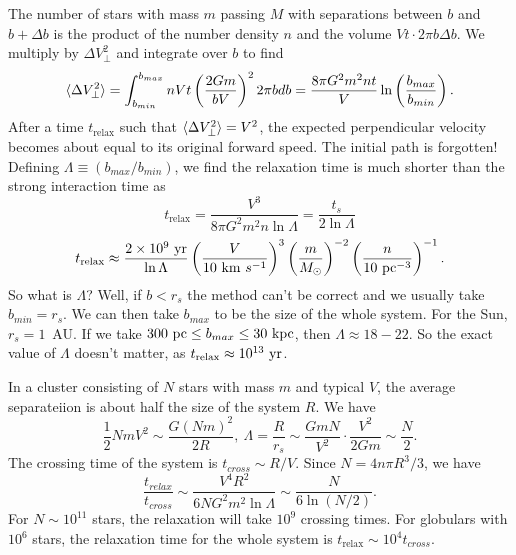 \documentclass[]{article}
\begin{document}
The number of stars with mass $m$ passing $M$ with
separations between $b$ and $b+\Delta b$ is the product of
the number density $n$ and the volume $V t \cdot 2 \pi b\Delta b$.
We multiply by $\Delta V_{\perp}^{2}$ and integrate over $b$ to find
\begin{equation}
\langle\Delta V_{\perp}^{2}\rangle = \int_{b_{min}}^{b_{max}} n V t\left(\frac{2Gm}{bV}\right)^2 2 \pi b db = \frac{8 \pi G^2 m^2 nt}{V} \ln \left(\frac{b_{max}}{b_{min}}\right).
\end{equation}
\noindent
After a time $t_{\mathrm{relax}}$ such that $\langle\Delta V_{\perp}^2\rangle = V^2$, the expected perpendicular 
velocity becomes about equal to its original forward speed.  The initial path is forgotten!
Defining $\Lambda\equiv (b_{max}/b_{min})$, we find the relaxation time is much shorter than
the strong interaction time as
\begin{equation}
t_{\mathrm{relax}} = \frac{V^3}{8\pi G^2 m^2 n \ln \Lambda} = \frac{t_s}{2 \ln \Lambda}
\end{equation}
\begin{equation}
t_{\mathrm{relax}} \approx \frac{2\times10^9~\mathrm{yr}}{\ln \Lambda}\left(\frac{V}{10~\mathrm{km}~s^{-1}}\right)^3\left(\frac{m}{M_{\odot}}\right)^{-2}\left(\frac{n}{10~\mathrm{pc}^{-3}}\right)^{-1}.
\end{equation}
\noindent
So what is $\Lambda$?  Well, if $b<r_s$ the method can't be correct and we usually take $b_{min} = r_s$.  We
can then take $b_{max}$ to be the size of the whole system.  For the Sun, $r_s = 1$~AU.  If we 
take $300~\mathrm{pc} \leq b_{max} \leq 30~\mathrm{kpc}$, then $\Lambda\approx18-22$.  So the exact value of
$\Lambda$ doesn't matter, as $t_{\mathrm{relax}}\approx10^{13}~\mathrm{yr}$.

In a cluster consisting of $N$ stars with mass $m$ and typical $V$, the average separateiion is about
half the size of the system $R$.  We have
\begin{equation}
\frac{1}{2}NmV^2 \sim \frac{G(Nm)^2}{2R},~\Lambda = \frac{R}{r_s} \sim \frac{GmN}{V^2} \cdot \frac{V^2}{2Gm}\sim\frac{N}{2}.
\end{equation}
The crossing time of the system is $t_{cross} \sim R/V$.  Since $N=4n\pi R^3 /3$, we have
\begin{equation}
\frac{t_{relax}}{t_{cross}} \sim \frac{V^4 R^2}{6 N G^2 m^2 \ln \Lambda} \sim \frac{N}{6 \ln (N/2)}.
\end{equation}
\noindent
For $N\sim10^{11}$ stars, the relaxation will take $10^9$ crossing times.  For globulars with $10^6$ stars,
the relaxation time for the whole system is $t_{\mathrm{relax}} \sim 10^4 t_{cross}$.
\end{document}
